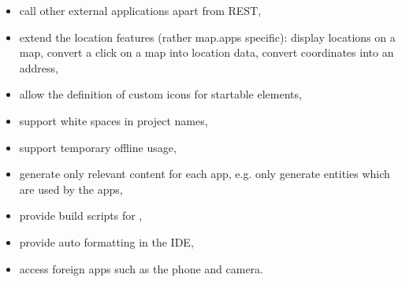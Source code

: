 \begin{itemize}
\item call other external applications apart from REST,
\item extend the location features (rather map.apps specific):
\subitem display locations on a map,
\subitem convert a click on a map into location data,
\subitem convert coordinates into an address,
\item allow the definition of custom icons for startable elements,
\item support white spaces in project names,
\item support temporary offline usage,
\item generate only relevant content for each app, e.g. only generate entities which are used by the apps,
\item provide build scripts for \MD,
\item provide auto formatting in the IDE,
\item access foreign apps such as the phone and camera.
\end{itemize}


